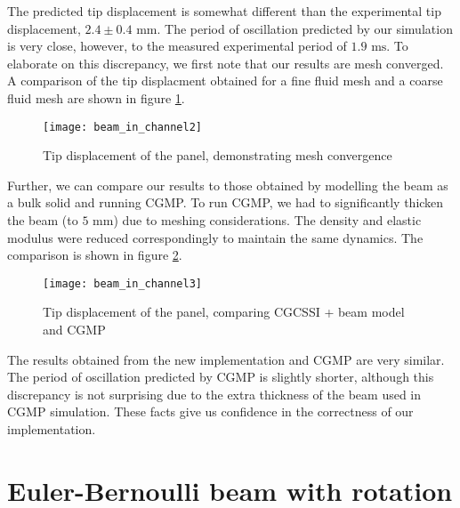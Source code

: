 \documentclass{article}
\begin{document}
The predicted tip displacement is somewhat different than the experimental tip displacement, $2.4 \pm 0.4 \mbox{ mm}$. 
The period of oscillation predicted by our simulation is very close, however, to the measured experimental period of $1.9 \mbox{ ms}$.
To elaborate on this discrepancy, we first note that our results are mesh converged. 
A comparison of the tip displacment obtained for a fine fluid mesh and a coarse fluid mesh are shown in figure \ref{fig:BeamInChannelTip2}.
\begin{figure}[ht]
        \centering
        \texttt{[image: beam\_in\_channel2]} 
        \caption{Tip displacement of the panel, demonstrating mesh convergence}
        \label{fig:BeamInChannelTip2}
\end{figure}
Further, we can compare our results to those obtained by modelling the beam as a bulk solid and running CGMP.  
To run CGMP, we had to significantly thicken the beam (to $5 \mbox{ mm}$) due to meshing considerations. 
The density and elastic modulus were reduced correspondingly to maintain the same dynamics.
The comparison is shown in figure \ref{fig:BeamInChannelTip3}.
\begin{figure}[ht]
        \centering
        \texttt{[image: beam\_in\_channel3]} 
        \caption{Tip displacement of the panel, comparing CGCSSI + beam model and CGMP}
        \label{fig:BeamInChannelTip3}
\end{figure}
The results obtained from the new implementation and CGMP are very similar.  
The period of oscillation predicted by CGMP is slightly shorter, although this discrepancy is not surprising due to the extra thickness of the beam used in CGMP simulation.
These facts give us confidence in the correctness of our implementation.

\section{Euler-Bernoulli beam with rotation}
\end{document}
